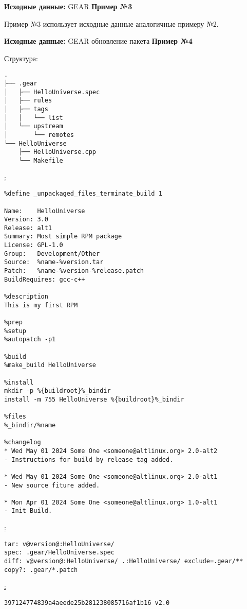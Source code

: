 \textbf{Исходные данные:} GEAR \textbf{Пример №3}

Пример №3  использует исходные данные аналогичные примеру №2.

\break

\textbf{Исходные данные:} GEAR обновление пакета \textbf{Пример №4}

\noindent Структура:
\begin{verbatim}
.
├── .gear
│   ├── HelloUniverse.spec
│   ├── rules
│   ├── tags
│   │   └── list
│   └── upstream
│       └── remotes
└── HelloUniverse
    ├── HelloUniverse.cpp
    └── Makefile

\end{verbatim}

\noindent\underline{:}
\begin{verbatim}
%define _unpackaged_files_terminate_build 1

Name:    HelloUniverse
Version: 3.0
Release: alt1
Summary: Most simple RPM package
License: GPL-1.0
Group:   Development/Other
Source:  %name-%version.tar
Patch:   %name-%version-%release.patch
BuildRequires: gcc-c++

%description
This is my first RPM

%prep
%setup
%autopatch -p1

%build
%make_build HelloUniverse

%install
mkdir -p %{buildroot}%_bindir
install -m 755 HelloUniverse %{buildroot}%_bindir

%files
%_bindir/%name

%changelog
* Wed May 01 2024 Some One <someone@altlinux.org> 2.0-alt2
- Instructions for build by release tag added.

* Wed May 01 2024 Some One <someone@altlinux.org> 2.0-alt1
- New source fiture added.

* Mon Apr 01 2024 Some One <someone@altlinux.org> 1.0-alt1
- Init Build.

\end{verbatim}


\noindent\underline{:}
\begin{verbatim}
tar: v@version@:HelloUniverse/
spec: .gear/HelloUniverse.spec
diff: v@version@:HelloUniverse/ .:HelloUniverse/ exclude=.gear/**
copy?: .gear/*.patch

\end{verbatim}

\noindent\underline{:}
\begin{verbatim}
397124774839a4aeede25b281238085716af1b16 v2.0

\end{verbatim}

